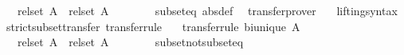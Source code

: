 \begin{isabellebody}
\ \ \ {\isachardoublequoteopen}{\isacharparenleft}{\kern0pt}rel{\isacharunderscore}{\kern0pt}set\ A\ {\isacharequal}{\kern0pt}{\isacharequal}{\kern0pt}{\isacharequal}{\kern0pt}{\isachargreater}{\kern0pt}\ rel{\isacharunderscore}{\kern0pt}set\ A\ {\isacharequal}{\kern0pt}{\isacharequal}{\kern0pt}{\isacharequal}{\kern0pt}{\isachargreater}{\kern0pt}\ {\isacharparenleft}{\kern0pt}{\isacharequal}{\kern0pt}{\isacharparenright}{\kern0pt}{\isacharparenright}{\kern0pt}\ {\isacharparenleft}{\kern0pt}{\isasymsubseteq}{\isacharparenright}{\kern0pt}\ {\isacharparenleft}{\kern0pt}{\isasymsubseteq}{\isacharparenright}{\kern0pt}{\isachardoublequoteclose}\isanewline
%
\isadelimproof
\ \ %
\endisadelimproof
%
\isatagproof
{}\isamarkupfalse%
\ subset{\isacharunderscore}{\kern0pt}eq\ {\isacharbrackleft}{\kern0pt}abs{\isacharunderscore}{\kern0pt}def{\isacharbrackright}{\kern0pt}\ \isamarkupfalse%
\ transfer{\isacharunderscore}{\kern0pt}prover%
\endisatagproof
{\isafoldproof}%
%
\isadelimproof
\isanewline
%
\endisadelimproof
\isanewline
{}\isamarkupfalse%
\isanewline
\ \ \ lifting{\isacharunderscore}{\kern0pt}syntax\isanewline
{}\isanewline
\isanewline
{}\isamarkupfalse%
\ strict{\isacharunderscore}{\kern0pt}subset{\isacharunderscore}{\kern0pt}transfer\ {\isacharbrackleft}{\kern0pt}transfer{\isacharunderscore}{\kern0pt}rule{\isacharbrackright}{\kern0pt}{\isacharcolon}{\kern0pt}\isanewline
\ \ \ {\isacharbrackleft}{\kern0pt}transfer{\isacharunderscore}{\kern0pt}rule{\isacharbrackright}{\kern0pt}{\isacharcolon}{\kern0pt}\ {\isachardoublequoteopen}bi{\isacharunderscore}{\kern0pt}unique\ A{\isachardoublequoteclose}\isanewline
\ \ \ {\isachardoublequoteopen}{\isacharparenleft}{\kern0pt}rel{\isacharunderscore}{\kern0pt}set\ A\ {\isacharequal}{\kern0pt}{\isacharequal}{\kern0pt}{\isacharequal}{\kern0pt}{\isachargreater}{\kern0pt}\ rel{\isacharunderscore}{\kern0pt}set\ A\ {\isacharequal}{\kern0pt}{\isacharequal}{\kern0pt}{\isacharequal}{\kern0pt}{\isachargreater}{\kern0pt}\ {\isacharparenleft}{\kern0pt}{\isacharequal}{\kern0pt}{\isacharparenright}{\kern0pt}{\isacharparenright}{\kern0pt}\ {\isacharparenleft}{\kern0pt}{\isasymsubset}{\isacharparenright}{\kern0pt}\ {\isacharparenleft}{\kern0pt}{\isasymsubset}{\isacharparenright}{\kern0pt}{\isachardoublequoteclose}\isanewline
%
\isadelimproof
\ \ %
\endisadelimproof
%
\isatagproof
{}\isamarkupfalse%
\ subset{\isacharunderscore}{\kern0pt}not{\isacharunderscore}{\kern0pt}subset{\isacharunderscore}{\kern0pt}eq\ \isamarkupfalse%

\end{isabellebody}
